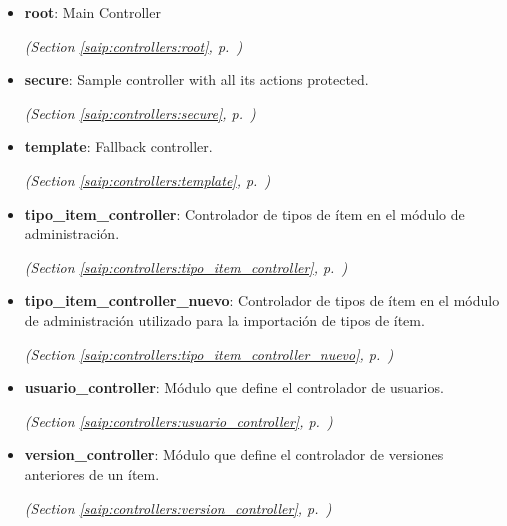 \begin{itemize}
\item \textbf{root}: Main Controller



  \textit{(Section \ref{saip:controllers:root}, p.~\pageref{saip:controllers:root})}

\item \textbf{secure}: Sample controller with all its actions protected.



  \textit{(Section \ref{saip:controllers:secure}, p.~\pageref{saip:controllers:secure})}

\item \textbf{template}: Fallback controller.



  \textit{(Section \ref{saip:controllers:template}, p.~\pageref{saip:controllers:template})}

\item \textbf{tipo\_item\_controller}: Controlador de tipos de ítem en el módulo de administración.



  \textit{(Section \ref{saip:controllers:tipo_item_controller}, p.~\pageref{saip:controllers:tipo_item_controller})}

\item \textbf{tipo\_item\_controller\_nuevo}: Controlador de tipos de ítem en el módulo de administración utilizado para 
la importación de tipos de ítem.



  \textit{(Section \ref{saip:controllers:tipo_item_controller_nuevo}, p.~\pageref{saip:controllers:tipo_item_controller_nuevo})}

\item \textbf{usuario\_controller}: Módulo que define el controlador de usuarios.



  \textit{(Section \ref{saip:controllers:usuario_controller}, p.~\pageref{saip:controllers:usuario_controller})}

\item \textbf{version\_controller}: Módulo que define el controlador de versiones anteriores de un ítem.



  \textit{(Section \ref{saip:controllers:version_controller}, p.~\pageref{saip:controllers:version_controller})}

\end{itemize}



